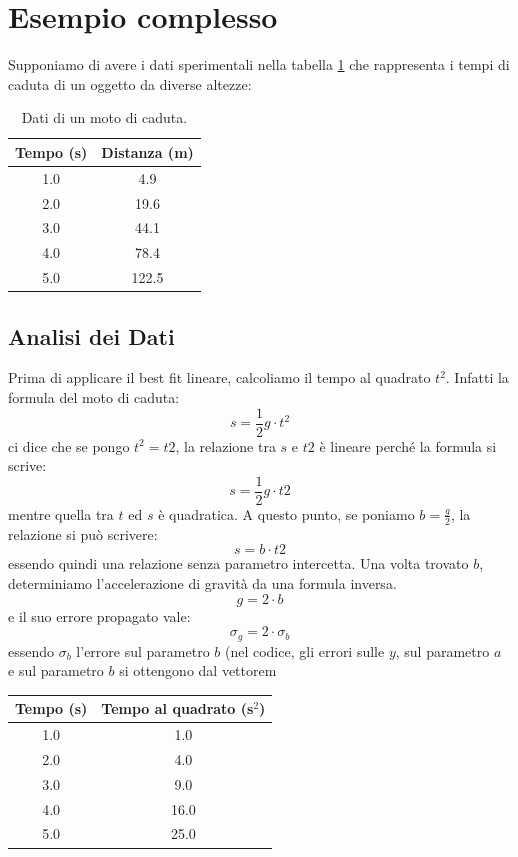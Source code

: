\section{Esempio complesso}
Supponiamo di avere i dati sperimentali nella tabella \ref{tab:regrcompl} che rappresenta i tempi di caduta di un oggetto da diverse altezze:
\begin{table}[h!]
\centering
\begin{tabular}{|c|c|}
\hline
Tempo (s) & Distanza (m) \\
\hline
1.0 & 4.9 \\
2.0 & 19.6 \\
3.0 & 44.1 \\
4.0 & 78.4 \\
5.0 & 122.5 \\
\hline
\end{tabular}
\caption{Dati di un moto di caduta.}
\label{tab:regrcompl}
\end{table}



\subsection{Analisi dei Dati}
Prima di applicare il best fit lineare, calcoliamo il tempo al quadrato \( t^2 \). Infatti la formula del moto di caduta:
\[
s=\frac{1}{2}g\cdot t^2
\]
ci dice che se pongo $t^2 =t2$, la relazione tra $s$ e  $t2$ è lineare perché la formula si scrive:
\[
s=\frac{1}{2} g \cdot t2
\]
mentre quella tra $t$ ed $s$ è quadratica. A questo punto, se poniamo  $b=\frac{g}{2}$, la relazione si può scrivere:
\[
s=b\cdot t2
\]
essendo quindi una relazione senza parametro intercetta. Una volta trovato $b$, determiniamo l'accelerazione di gravità da una formula inversa.
\[
g = 2\cdot b
\]
e il suo errore propagato vale:
\[\sigma_g = 2\cdot \sigma_b
\]
essendo $\sigma_b$ l'errore sul parametro $b$ (nel codice, gli errori sulle $y$, sul parametro $a$ e sul parametro $b$ si ottengono dal vettorem
\begin{center}
\begin{tabular}{|c|c|}
\hline
Tempo (s) & Tempo al quadrato (s\(^2\)) \\
\hline
1.0 & 1.0 \\
2.0 & 4.0 \\
3.0 & 9.0 \\
4.0 & 16.0 \\
5.0 & 25.0 \\
\hline
\end{tabular}
\end{center}

